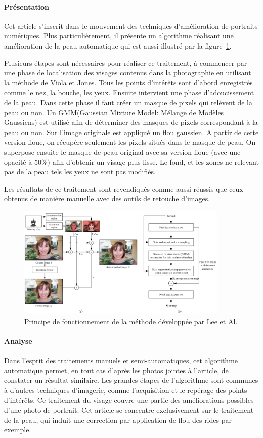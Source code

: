 \documentclass[11pt, french,screen]{report-rd-info}
\begin{document}
\paragraph{Présentation}
Cet article s'inscrit dans le mouvement des techniques d'amélioration de portraits numériques.
Plus particulièrement, il présente un algorithme réalisant une amélioration de la peau automatique qui est aussi illustré par la figure~\ref{fig:FonctionnementLee}.

Plusieurs étapes sont nécessaires pour réaliser ce traitement, à commencer par une phase de localisation des visages contenus dans la photographie en utilisant la méthode de Viola et Jones.
Tous les points d'intérêts sont d'abord enregistrés comme le nez, la bouche, les yeux.
Ensuite intervient une phase d'adoucissement de la peau.
Dans cette phase il faut créer un masque de pixels qui relèvent de la peau ou non.
Un GMM(Gaussian Mixture Model: Mélange de Modèles Gaussiens) est utilisé afin de déterminer des masques de pixels correspondant à la peau ou non.
Sur l’image originale est appliqué un flou gaussien. A partir de cette version floue, on récupère seulement les pixels situés dans le masque de peau. On superpose ensuite le masque de peau original avec sa version floue (avec une opacité à 50\%) afin d’obtenir un visage plus lisse. Le fond, et les zones ne relevant pas de la peau tels les yeux ne sont pas modifiés.

Les résultats de ce traitement sont revendiqués comme aussi réussis que ceux obtenus de manière manuelle avec des outils de retouche d'images.
\begin{figure}
	\centering
\includegraphics[width=0.9\textwidth]{Images/ea_algo_smoothing}
	\caption{Principe de fonctionnement de la méthode développée par Lee et Al.\cite{Lee}}
	\label{fig:FonctionnementLee}
\end{figure}
\paragraph{Analyse}
Dans l'esprit des traitements manuels et semi-automatiques, cet algorithme automatique permet, en tout cas d'après les photos jointes à l'article, de constater un résultat similaire.
Les grandes étapes de l'algorithme sont communes à d'autres techniques d'imagerie, comme l'acquisition et le repérage des points d'intérêts.
Ce traitement du visage couvre une partie des améliorations possibles d'une photo de portrait. Cet article se concentre exclusivement sur le traitement de la peau, qui induit une correction par application de flou des rides par exemple.
\end{document}

